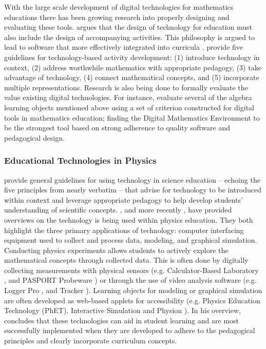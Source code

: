 With the large scale development of digital technologies for mathematics educations there has been growing research into properly designing and evaluating these tools. \citet{drijvers2012digital} argues that the design of technology for education must also include the design of accompanying activities. This philosophy is argued to lead to software that more effectively integrated into curricula \citep{freiman2014technology}. \citet{stohl2000promoting} provide five guidelines for technology-based activity development: (1) introduce technology in context, (2) address worthwhile mathematics with appropriate pedagogy, (3) take advantage of technology, (4) connect mathematical concepts, and (5) incorporate multiple representations. Research is also being done to formally evaluate the value existing digital technologies. For instance, \citet{bokhove2010digital} evaluate several of the algebra learning objects mentioned above using a set of criterion constructed for digital tools in mathematics education; finding the Digital Mathematics Environment \citep{DME} to be the strongest tool based on strong adherence to quality software and pedagogical design. 

\subsubsection{Educational Technologies in Physics}
\label{EdTechPhysics}

\citet{flick2000preparing} provide general guidelines for using technology in science education -- echoing the five principles from \citet{stohl2000promoting} nearly verbatim -- that advise for technology to be introduced within context and leverage appropriate pedagogy to help develop students' understanding of scientific concepts. \citet{rios2000guide}, and more recently \citet{bryan2006technology}, have provided overviews on the technology is being used within physics education. They both highlight the three primary applications of technology: computer interfacing equipment used to collect and process data, modeling, and graphical simulation. Conducting physics experiments allows students to actively explore the mathematical concepts through collected data. This is often done by digitally collecting measurements with physical sensors (e.g. Calculator-Based Laboratory \citep{cbl}, and PASPORT Probeware \citep{pasport}) or through the use of video analysis software (e.g. Logger Pro \citep{loggerpro}, and Tracker \citep{tracker}). Learning objects for modeling or graphical simulation are often developed as web-based applets for accessibility (e.g. Physics Education Technology (PhET), Interactive Simulation \citep{PhET} and Physion \citep{physion}). In his overview, \citet{bryan2006technology} concludes that these technologies can aid in student learning and are most successfully implemented when they are developed to adhere to the pedagogical principles and clearly incorporate curriculum concepts. 

